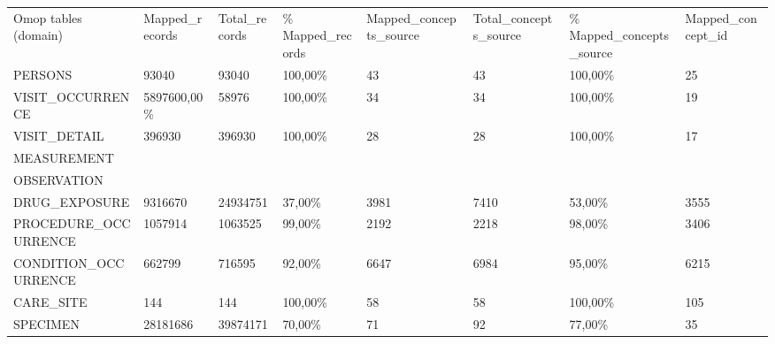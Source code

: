 \begin{table}[]
\begin{tabular}{llllllll}
Omop tables (domain)  & Mapped\_records & Total\_records & \% Mapped\_records & Mapped\_concepts\_source & Total\_concepts\_source & \% Mapped\_concepts\_source & Mapped\_concept\_id \\
PERSONS               & 93040           & 93040          & 100,00\%           & 43                       & 43                      & 100,00\%                    & 25                  \\
VISIT\_OCCURRENCE     & 5897600,00\%    & 58976          & 100,00\%           & 34                       & 34                      & 100,00\%                    & 19                  \\
VISIT\_DETAIL         & 396930          & 396930         & 100,00\%           & 28                       & 28                      & 100,00\%                    & 17                  \\
MEASUREMENT           &                 &                &                    &                          &                         &                             &                     \\
OBSERVATION           &                 &                &                    &                          &                         &                             &                     \\
DRUG\_EXPOSURE        & 9316670         & 24934751       & 37,00\%            & 3981                     & 7410                    & 53,00\%                     & 3555                \\
PROCEDURE\_OCCURRENCE & 1057914         & 1063525        & 99,00\%            & 2192                     & 2218                    & 98,00\%                     & 3406                \\
CONDITION\_OCCURRENCE & 662799          & 716595         & 92,00\%            & 6647                     & 6984                    & 95,00\%                     & 6215                \\
CARE\_SITE            & 144             & 144            & 100,00\%           & 58                       & 58                      & 100,00\%                    & 105                 \\
SPECIMEN              & 28181686        & 39874171       & 70,00\%            & 71                       & 92                      & 77,00\%                     & 35                 
\end{tabular}
\end{table}

